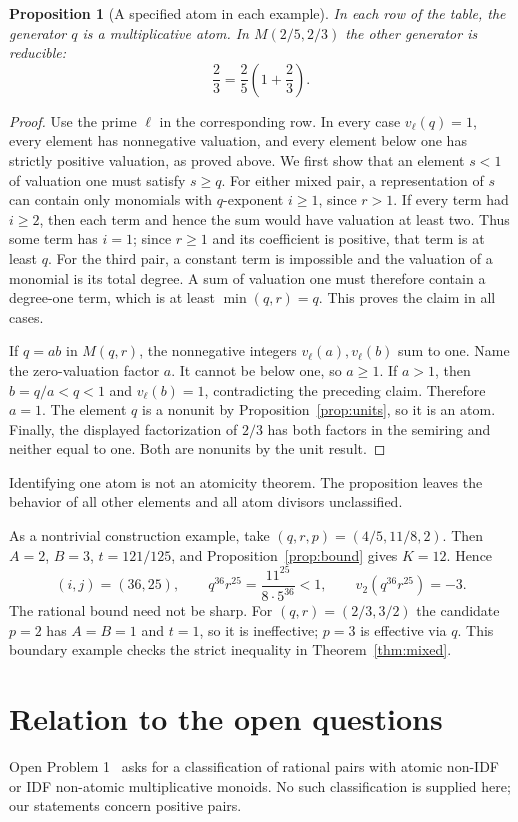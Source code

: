 \documentclass[11pt]{article}
\newtheorem{proposition}[theorem]{Proposition}
\theoremstyle{definition}
\begin{document}
\begin{proposition}[A specified atom in each example]\label{prop:atom}
In each row of the table, the generator $q$ is a multiplicative atom.
In $M(2/5,2/3)$ the other generator is reducible:
\[
 \frac23=\frac25\left(1+\frac23\right).
\]
\end{proposition}
\begin{proof}
Use the prime $\ell$ in the corresponding row. In every case
$v_\ell(q)=1$, every element has nonnegative valuation, and every element
below one has strictly positive valuation, as proved above.
We first show that an element $s<1$ of valuation one must satisfy $s\ge q$.
For either mixed pair, a representation of $s$ can contain only monomials
with $q$-exponent $i\ge1$, since $r>1$. If every term had $i\ge2$, then
each term and hence the sum would have valuation at least two. Thus some
term has $i=1$; since $r\ge1$ and its coefficient is positive, that term
is at least $q$. For the third pair, a constant term is impossible and
the valuation of a monomial is its total degree. A sum of valuation one
must therefore contain a degree-one term, which is at least
$\min(q,r)=q$. This proves the claim in all cases.

If $q=ab$ in $M(q,r)$, the nonnegative integers
$v_\ell(a),v_\ell(b)$ sum to one. Name the zero-valuation factor $a$.
It cannot be below one, so $a\ge1$. If $a>1$, then $b=q/a<q<1$ and
$v_\ell(b)=1$, contradicting the preceding claim. Therefore $a=1$.
The element $q$ is a nonunit by Proposition~\ref{prop:units}, so it is an atom.
Finally, the displayed factorization of $2/3$ has both factors in the
semiring and neither equal to one. Both are nonunits by the unit result.
\end{proof}

Identifying one atom is not an atomicity theorem. The proposition leaves
the behavior of all other elements and all atom divisors unclassified.

As a nontrivial construction example, take $(q,r,p)=(4/5,11/8,2)$.
Then $A=2$, $B=3$, $t=121/125$, and Proposition~\ref{prop:bound} gives
$K=12$. Hence
\[
 (i,j)=(36,25),\qquad
 q^{36}r^{25}=\frac{11^{25}}{8\cdot5^{36}}<1,\qquad
 v_2(q^{36}r^{25})=-3.
\]
The rational bound need not be sharp. For $(q,r)=(2/3,3/2)$ the
candidate $p=2$ has $A=B=1$ and $t=1$, so it is ineffective;
$p=3$ is effective via $q$. This boundary example checks the strict
inequality in Theorem~\ref{thm:mixed}.

\section{Relation to the open questions}
Open Problem 1~\cite{cm1} asks for a classification of rational pairs with
atomic non-IDF or IDF non-atomic multiplicative monoids. No such
classification is supplied here; our statements concern positive pairs.
\end{document}
